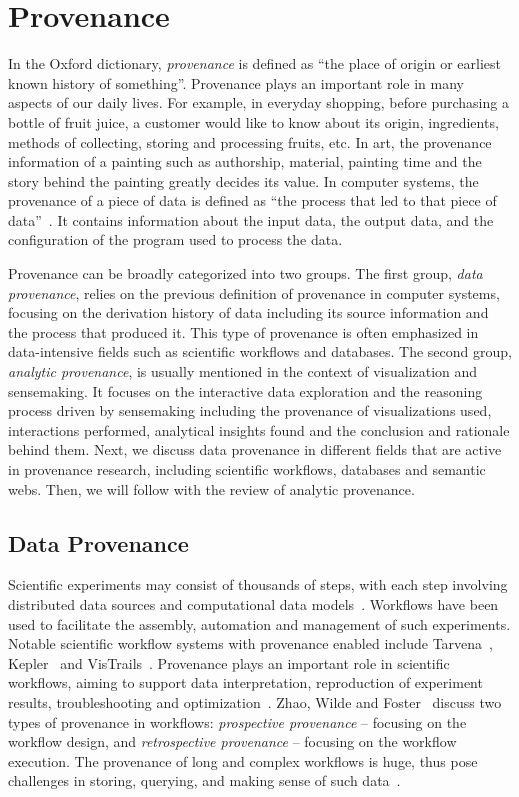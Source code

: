 \section{Provenance}
In the Oxford dictionary, \emph{provenance} is defined as ``the place of origin or earliest known history of something''. Provenance plays an important role in many aspects of our daily lives. For example, in everyday shopping, before purchasing a bottle of fruit juice, a customer would like to know about its origin, ingredients, methods of collecting, storing and processing fruits, etc. In art, the provenance information of a painting such as authorship, material, painting time and the story behind the painting greatly decides its value. In computer systems, the provenance of a piece of data is defined as ``the process that led to that piece of data''~\cite{Moreau2011}. It contains information about the input data, the output data, and the configuration of the program used to process the data.

Provenance can be broadly categorized into two groups. The first group, \emph{data provenance}, relies on the previous definition of provenance in computer systems, focusing on the derivation history of data including its source information and the process that produced it. This type of provenance is often emphasized in data-intensive fields such as scientific workflows and databases. The second group, \emph{analytic provenance}, is usually mentioned in the context of visualization and sensemaking. It focuses on the interactive data exploration and the reasoning process driven by sensemaking including the provenance of visualizations used, interactions performed, analytical insights found and the conclusion and rationale behind them. Next, we discuss data provenance in different fields that are active in provenance research, including scientific workflows, databases and semantic webs. Then, we will follow with the review of analytic provenance.

\subsection{Data Provenance}
\label{sub:lr-data-provenance}
Scientific experiments may consist of thousands of steps, with each step involving distributed data sources and computational data models~\cite{Gil2007}. Workflows have been used to facilitate the assembly, automation and management of such experiments. Notable scientific workflow systems with provenance enabled include Tarvena~\cite{Zhao2008}, Kepler~\cite{Bowers2006} and VisTrails~\cite{Bavoil2005}. Provenance plays an important role in scientific workflows, aiming to support data interpretation, reproduction of experiment results, troubleshooting and optimization~\cite{Miles2007}. Zhao, Wilde and Foster~\cite{Zhao2006} discuss two types of provenance in workflows: \emph{prospective provenance} -- focusing on the workflow design, and \emph{retrospective provenance} -- focusing on the workflow execution. The provenance of long and complex workflows is huge, thus pose challenges in storing, querying, and making sense of such data~\cite{Davidson2007}.

